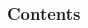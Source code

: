 \begin{frame}
\frametitle{Contents} 
\begin{multicols}{2}
\tableofcontents
\end{multicols}
\end{frame}
